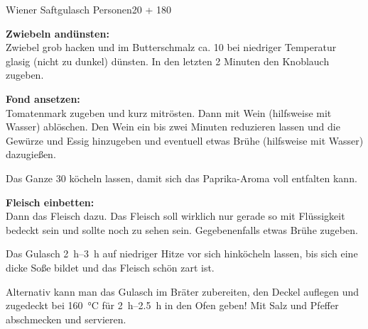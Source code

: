 \begin{MyRecipe}{Wiener Saftgulasch}{ Personen}{\SI{20}{\minuteprime} + \SI{180}{\minuteprime}}


\textbf{Zwiebeln andünsten:}\\
Zwiebel grob hacken und im Butterschmalz ca. \SI{10}{\minuteprime} bei niedriger Temperatur glasig (nicht zu dunkel) dünsten. In den letzten 2 Minuten den Knoblauch zugeben.\par\bigskip	

\textbf{Fond ansetzen:}\\
Tomatenmark zugeben und kurz mitrösten. Dann mit Wein (hilfsweise mit Wasser) ablöschen. Den Wein ein bis zwei Minuten reduzieren lassen und die Gewürze und Essig hinzugeben und eventuell etwas Brühe (hilfsweise mit Wasser) dazugießen.\par
Das Ganze \SI{30}{\minuteprime} köcheln lassen, damit sich das Paprika-Aroma voll entfalten kann.\par\bigskip	

\textbf{Fleisch einbetten:}\\
Dann das Fleisch dazu. Das Fleisch soll wirklich nur gerade so mit Flüssigkeit bedeckt sein und sollte noch zu sehen sein. Gegebenenfalls etwas Brühe zugeben.\par
Das Gulasch \SIrange{2}{3}{\hour} auf niedriger Hitze vor sich hinköcheln lassen, bis sich eine dicke Soße bildet und das Fleisch schön zart ist.\par
Alternativ kann man das Gulasch im Bräter zubereiten, den Deckel auflegen und zugedeckt bei \SI{160}{\degreeCelsius} für \SIrange{2}{2,5}{\hour} in den Ofen geben! Mit Salz und Pfeffer abschmecken und servieren.\par\bigskip	
		
\end{MyRecipe}